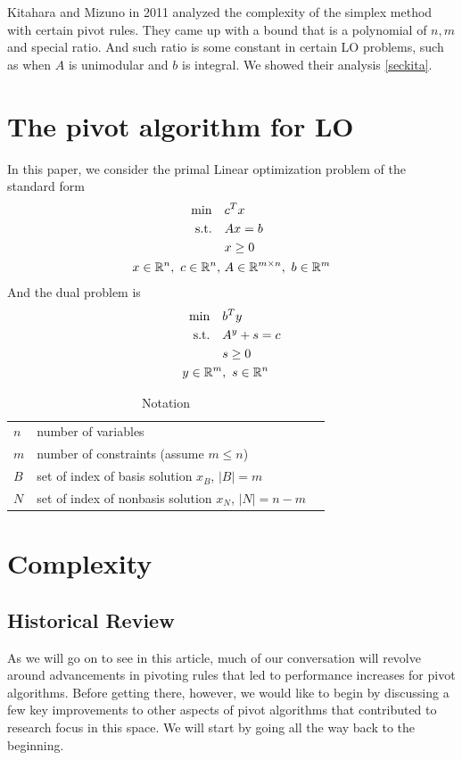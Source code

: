 \documentclass[11pt]{article}
\begin{document}
Kitahara and Mizuno in 2011 \cite{kitahara2013bound} analyzed the complexity of the simplex method with certain pivot rules. They came up with a bound that is a polynomial of $n, m$ and special ratio. And such ratio is some constant in certain LO problems, such as when $A$ is unimodular and $b$ is integral. We showed their analysis \ref{seckita}.

\section{The pivot algorithm for LO}
In this paper, we consider the primal Linear optimization problem of the standard form
\begin{align}
\begin{split}
\min \quad &c^Tx\\
\text{s.t.} \quad &Ax = b\\
&x \ge 0\\
 x \in \mathbb{R}^n,\ c \in \mathbb{R}^n,\ &A \in \mathbb{R}^{m\times n},\ b \in \mathbb{R}^m   
\end{split} \label{LOprimal}
\end{align}
And the dual problem is 
\begin{align}
\begin{split}
\min \quad &b^Ty\\
\text{s.t.} \quad &A^y + s = c\\
&s \ge 0\\
 y \in \mathbb{R}^m&,\ s \in \mathbb{R}^n   
\end{split} \label{LOdual}
\end{align}
\begin{table}[h]
\caption{Notation}
\centering
\begin{tabular}{lll}
\hline
$n$ & number of variables   &  \\
$m$ & number of constraints (assume $m \le n$) &  \\
$B$ & set of index of basis solution $x_B$, $|B| = m$&  \\
$N$ & set of index of nonbasis solution $x_N$, $|N| = n-m$&  \\
\hline
\end{tabular}
\end{table}

\section{Complexity}
\subsection{Historical Review}
As we will go on to see in this article, much of our conversation will revolve around advancements in pivoting rules that led to performance increases for pivot algorithms. Before getting there, however, we would like to begin by discussing a few key improvements to other aspects of pivot algorithms that contributed to research focus in this space. We will start by going all the way back to the beginning.
\end{document}
